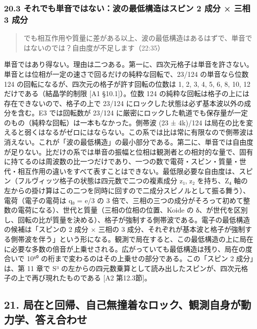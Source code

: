 \documentclass[
  a4paper,
]{ltjsarticle}
\begin{document}
\subsubsection{20.3 それでも単音ではない：波の最低構造はスピン 2 成分 ×
三相 3
成分}\label{ux305dux308cux3067ux3082ux5358ux97f3ux3067ux306fux306aux3044ux6ce2ux306eux6700ux4f4eux69cbux9020ux306fux30b9ux30d4ux30f3-2-ux6210ux5206-ux4e09ux76f8-3-ux6210ux5206}

\begin{quote}
でも相互作用や質量に差がある以上、波の最低構造はあるはずで、単音ではないのでは？自由度が不足します（22:35）
\end{quote}

単音ではあり得ない。理由は二つある。第一に、四次元格子は単音を許さない。単音とは位相が一定の速さで回るだけの純粋な回転で、23/124
の単音なら位数 124 の回転になるが、四次元の格子が許す回転の位数は 1, 2,
3, 4, 5, 6, 8, 10, 12 だけである（結晶学的制限 {[}A1 §10.1{]}）。位数
124 の純粋な回転は格子の上には存在できないので、格子の上で 23/124
にロックした状態は必ず基本波以外の成分を含む。E3 では回転数が 23/124
に厳密にロックした軌道でも保存量が一定のもの（純粋な回転）は一本もなかった。側帯波
(23 ± 4k)/124
は局在の比を変えると弱くはなるがゼロにはならない。この系では比は常に有限なので側帯波は消えない。これが「波の最低構造」の最小部分である。第二に、単音では自由度が足りない。比だけの系では単音の振幅と位相は観測者との相対的な量で、固有に持てるのは周波数の比一つだけであり、一つの数で電荷・スピン・質量・世代・相互作用の違いをすべて表すことはできない。最低限必要な自由度は、スピン（フルヴィッツ格子の状態は四元数で二つの複素成分
z₁, z₂ を持ち、Z₄
軸の左からの掛け算はこの二つを同時に回すので二成分スピノルとして振る舞う）、電荷（電子の電荷は
q₀ = e/3 の 3
倍で、三相の三つの成分がそろって初めて整数の電荷になる）、世代と質量（三相の位相の位置、Koide
の
δ、が世代を区別し、回転の比が質量を決める）、格子が強制する側帯波である。電子の最低構造の候補は「スピンの
2 成分 × 三相の 3
成分、それぞれが基本波と格子が強制する側帯波を伴う」という形になる。観測で局在すると、この最低構造の上に局在に必要な多数の倍音が上乗せされる。広がっていても最低構造は残り、局在の度合いで
10⁶⁰ の桁まで変わるのはその上乗せの部分である。この「スピン 2
成分」は、第 11 章で S³
の左からの四元数乗算として読み出したスピンが、四次元格子の上で再び現れたものである
{[}A2 第12.3節{]}。

\subsection{21.
局在と回帰、自己無撞着なロック、観測自身が動力学、答え合わせ}\label{ux5c40ux5728ux3068ux56deux5e30ux81eaux5df1ux7121ux649eux7740ux306aux30edux30c3ux30afux89b3ux6e2cux81eaux8eabux304cux52d5ux529bux5b66ux7b54ux3048ux5408ux308fux305b}
\end{document}
